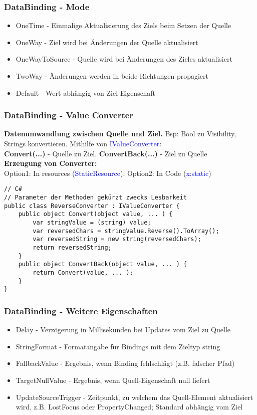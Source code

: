 \subsubsection{DataBinding - Mode}
\begin{itemize}[topsep=0pt, leftmargin=4mm]
    \setlength\itemsep{-0.3em}
    \item OneTime - Einmalige Aktualisierung des Ziels beim Setzen der Quelle
    \item OneWay - Ziel wird bei Änderungen der Quelle aktualisiert
    \item OneWayToSource - Quelle wird bei Änderungen des Zieles aktualisiert
    \item TwoWay - Änderungen werden in beide Richtungen propagiert
    \item Default - Wert abhängig von Ziel-Eigenschaft
\end{itemize}
\subsubsection{DataBinding - Value Converter}
\textbf{Datenumwandlung zwischen Quelle und Ziel.} Bsp: Bool zu Visibility, Strings konvertieren. Mithilfe von \textcolor{blue}{IValueConverter}:\\
\textbf{Convert(...)} - Quelle zu Ziel. \textbf{ConvertBack(...)} - Ziel zu Quelle\\
\textbf{Erzeugung von Converter:}\\
Option1: In resources (\textcolor{blue}{StaticResource}). Option2: In Code (\textcolor{blue}{x:static})
\begin{lstlisting}
// C#
// Parameter der Methoden gekürzt zwecks Lesbarkeit
public class ReverseConverter : IValueConverter {
    public object Convert(object value, ... ) {
        var stringValue = (string) value;
        var reversedChars = stringValue.Reverse().ToArray();
        var reversedString = new string(reversedChars);
        return reversedString;
    }
    public object ConvertBack(object value, ... ) {
        return Convert(value, ... );
    }
}
\end{lstlisting}
\subsubsection{DataBinding - Weitere Eigenschaften}
\begin{itemize}[topsep=0pt, leftmargin=4mm]
    \setlength\itemsep{-0.3em}
    \item Delay - Verzögerung in Millisekunden bei Updates vom Ziel zu Quelle
    \item StringFormat - Formatangabe für Bindings mit dem Zieltyp string
    \item FallbackValue - Ergebnis, wenn Binding fehlschlägt (z.B. falscher Pfad)
    \item TargetNullValue - Ergebnis, wenn Quell-Eigenschaft null liefert
    \item UpdateSourceTrigger - Zeitpunkt, zu welchem das Quell-Element aktualisiert wird. z.B. LostFocus oder PropertyChanged; Standard abhängig vom Ziel
\end{itemize}
